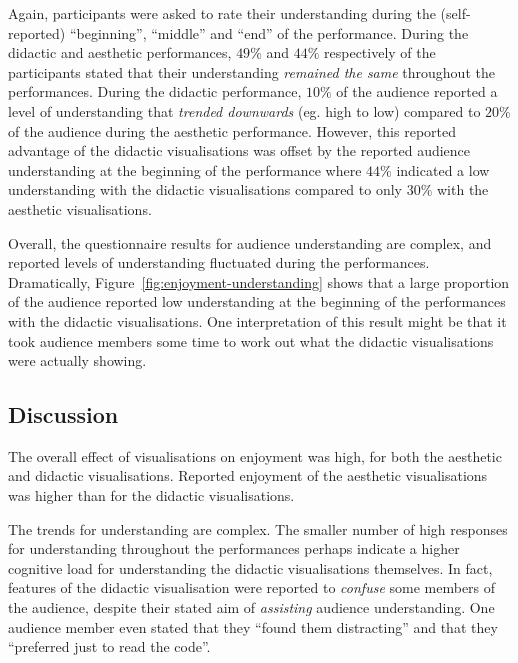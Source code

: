 \documentclass{sig-alternate}
\begin{document}
Again, participants were asked to rate their understanding during the
(self-reported) ``beginning'', ``middle'' and ``end'' of the
performance. During the didactic and aesthetic performances, $49\%$
and $44\%$ respectively of the participants stated that their
understanding \emph{remained the same} throughout the performances.
During the didactic performance, $10\%$ of the audience reported a
level of understanding that \emph{trended downwards} (eg. high to low)
compared to $20\%$ of the audience during the aesthetic performance.
However, this reported advantage of the didactic visualisations was
offset by the reported audience understanding at the beginning of the
performance where $44\%$ indicated a low understanding with the
didactic visualisations compared to only $30\%$ with the aesthetic
visualisations.

Overall, the questionnaire results for audience understanding are
complex, and reported levels of understanding fluctuated during the
performances. Dramatically, Figure~\ref{fig:enjoyment-understanding}
shows that a large proportion of the audience reported low
understanding at the beginning of the performances with the didactic
visualisations. One interpretation of this result might be that it
took audience members some time to work out what the didactic
visualisations were actually showing.

\subsection{Discussion}

The overall effect of visualisations on enjoyment was high, for both
the aesthetic and didactic visualisations. Reported enjoyment of the
aesthetic visualisations was higher than for the didactic
visualisations.

The trends for understanding are complex. The smaller number of high
responses for understanding throughout the performances perhaps
indicate a higher cognitive load for understanding the didactic
visualisations themselves. In fact, features of the didactic
visualisation were reported to \emph{confuse} some members of the
audience, despite their stated aim of \emph{assisting} audience
understanding. One audience member even stated that they ``found them
distracting'' and that they ``preferred just to read the code''.
\end{document}
